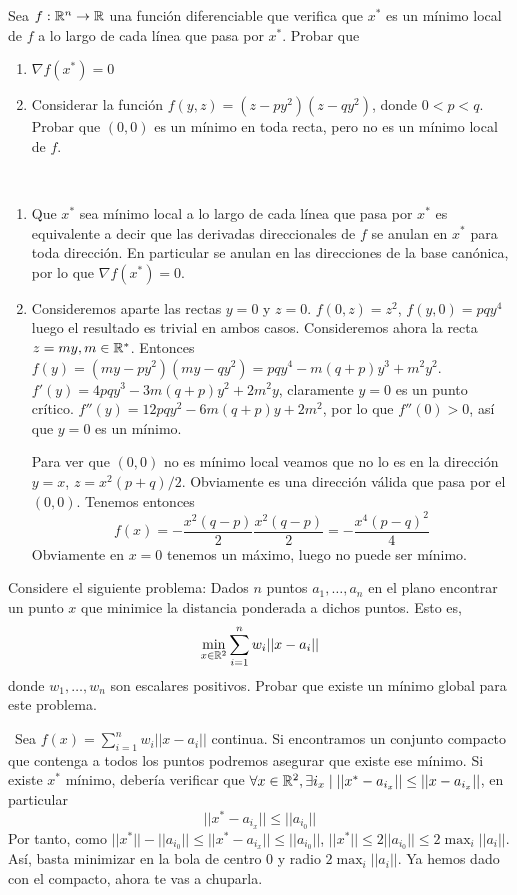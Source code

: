 \documentclass[twoside]{article}
\begin{document}
\begin{ejercicio}{3}
Sea $f:\mathbb{R}^n\to\mathbb{R}$ una función diferenciable que verifica que $x^*$ es un mínimo local de $f$ a lo largo de cada línea que pasa por $x^*$. Probar que 
\begin{enumerate}
\item $\nabla f(x^*)=0$
\item Considerar la función $f(y,z)=(z-py^2)(z-qy^2)$, donde $0<p<q$. Probar que $(0,0)$ es un mínimo en toda recta, pero no es un mínimo local de $f$.
\end{enumerate}

\begin{solucion}\
\begin{enumerate}
\item Que $x^*$ sea mínimo local a lo largo de cada línea que pasa por $x^*$ es equivalente a decir que las derivadas direccionales de $f$ se anulan en $x^*$ para toda dirección. En particular se anulan en las direcciones de la base canónica, por lo que $\nabla f(x^*)=0$. 
\item Consideremos aparte las rectas $y=0$ y $z=0$. $f(0,z)=z^2$, $f(y,0)=pqy^4$ luego el resultado es trivial en ambos casos. Consideremos ahora la recta $z=my, m\in\mathbb{R}^*$. Entonces $f(y)=(my-py^2)(my-qy^2)= pqy^4-m(q+p)y^3 +m^2y^2$. $f'(y)=4pqy^3-3m(q+p)y^2+2m^2y$, claramente $y=0$ es un punto crítico. $f''(y)=12pqy^2-6m(q+p)y+2m^2$, por lo que $f''(0)>0$, así que $y=0$ es un mínimo. 

Para ver que $(0,0)$ no es mínimo local veamos que no lo es en la dirección $y=x$, $z=x^2(p+q)/2$. Obviamente es una dirección válida que pasa por el $(0,0)$. Tenemos entonces 
$$
f(x) = -\frac{x^2(q-p)}{2}\frac{x^2(q-p)}{2} = -\frac{x^4(p-q)^2}{4}
$$
Obviamente en $x=0$ tenemos un máximo, luego no puede ser mínimo.
\end{enumerate}
\end{solucion}
\end{ejercicio}

\newpage 

\begin{ejercicio}{4}
Considere el siguiente problema:
Dados $n$ puntos $a_1,\dots,a_n$ en el plano encontrar un punto $x$ que minimice la distancia ponderada a dichos puntos. Esto es,
$$\min_{x\in\mathbb{R}^2}\sum_{i=1}^nw_i||x-a_i||$$
donde $w_1,\dots,w_n$ son escalares positivos. Probar que existe un mínimo global para este problema. 
\begin{solucion}\
Sea $f(x)=\sum_{i=1}^nw_i||x-a_i||$ continua. Si encontramos un conjunto compacto que contenga a todos los puntos podremos asegurar que existe ese mínimo. Si existe $x^*$ mínimo, debería verificar que $\forall x\in\mathbb{R}^2, \exists i_x\mid ||x^*-a_{i_x}||\leq ||x-a_{i_x}||$, en particular $$||x^*-a_{i_x}||\leq ||a_{i_0}||$$
Por tanto, como $||x^*||-||a_{i_0}||\leq ||x^*-a_{i_x}||\leq ||a_{i_0}||$, $||x^*||\leq 2||a_{i_0}||\leq 2\max_i{||a_i||}$. Así, basta minimizar en la bola de centro 0 y radio $2\max_i{||a_i||}$. Ya hemos dado con el compacto, ahora te vas a chuparla.
\end{solucion}
\end{ejercicio}
\end{document}

